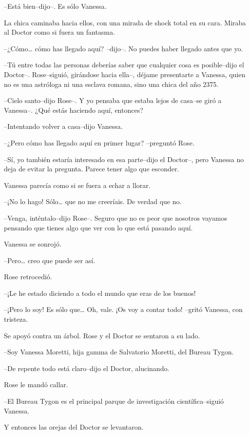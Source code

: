 --Está bien--dijo--. Es sólo Vanessa.

La chica caminaba hacia ellos, con una mirada de shock total en su cara.
Miraba al Doctor como si fuera un fantasma.

--¿Cómo\ldots{} cómo has llegado aquí? --dijo--. No puedes haber llegado
antes que yo.

--Tú entre todas las personas deberías saber que cualquier cosa es
posible--dijo el Doctor--. Rose--siguió, girándose hacia ella--, déjame
presentarte a Vanessa, quien no es una astróloga ni una esclava romana,
sino una chica del año 2375.

--Cielo santo--dijo Rose--. Y yo pensaba que estaba lejos de casa--se
giró a Vanessa--. ¿Qué estás haciendo aquí, entonces?

--Intentando volver a casa--dijo Vanessa.

--¿Pero cómo has llegado aquí en primer lugar? --preguntó Rose.

--Sí, yo también estaría interesado en esa parte--dijo el Doctor--, pero
Vanessa no deja de evitar la pregunta. Parece tener algo que esconder.

Vanessa parecía como si se fuera a echar a llorar.

--¡No lo hago! Sólo\ldots{} que no me creeríais. De verdad que no.

--Venga, inténtalo--dijo Rose--. Seguro que no es peor que nosotros
vayamos pensando que tienes algo que ver con lo que está pasando aquí.

Vanessa se sonrojó.

--Pero\ldots{} creo que puede ser así.

Rose retrocedió.

--¡Le he estado diciendo a todo el mundo que eras de los buenos!

--¡Pero lo soy! Es sólo que\ldots{} Oh, vale. ¡Os voy a contar todo!
--gritó Vanessa, con tristeza.

Se apoyó contra un árbol. Rose y el Doctor se sentaron a su lado.

--Soy Vanessa Moretti, hija gamma de Salvatorio Moretti, del Bureau
Tygon.

--De repente todo está claro--dijo el Doctor, alucinando.

Rose le mandó callar.

--El Bureau Tygon es el principal parque de investigación
científica--siguió Vanessa.

Y entonces las orejas del Doctor se levantaron.

